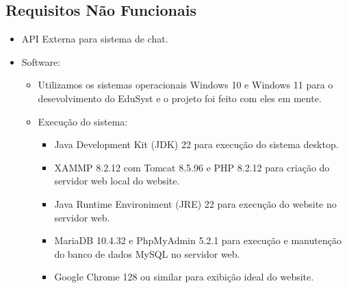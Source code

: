 \documentclass[main.tex]{subfiles}
\begin{document}
\subsection{Requisitos Não Funcionais}
\begin{itemize}
    \item API Externa para sistema de chat.

    \item Software:
    \begin{itemize}
        \item Utilizamos os sistemas operacionais Windows 10 e Windows 11 para o desevolvimento do EduSyst e o projeto foi feito com eles em mente. 
    
        \item Execução do sistema:
        \begin{itemize}
            \item Java Development Kit (JDK) 22 para execução do sistema desktop.
            \item XAMMP 8.2.12 com Tomcat 8.5.96 e PHP 8.2.12 para criação do servidor web local do website.
            \item Java Runtime Environiment (JRE) 22 para execução do website no servidor web.
            \item MariaDB 10.4.32 e PhpMyAdmin 5.2.1 para execução e manutenção do banco de dados MySQL no servidor web.
            \item Google Chrome 128 ou similar para exibição ideal do website. 
        \end{itemize}


\end{itemize}
\end{itemize}
\end{document}
